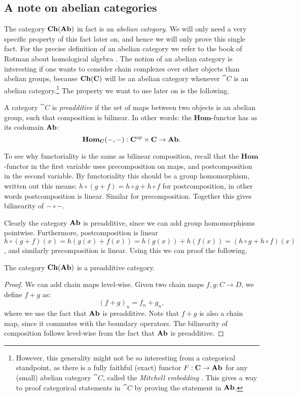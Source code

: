 \subsection{A note on abelian categories}
The category $\mathbf{Ch}(\mathbf{Ab})$ in fact is an \emph{abelian category}. We will only need a very specific property of this fact later on, and hence we will only prove this single fact. For the precise definition of an abelian category we refer to the book of Rotman about homological algebra \cite[Chapter~5.5]{rotman}. The notion of an abelian category is interesting if one wants to consider chain complexes over other objects than abelian groups, because $\mathbf{Ch}(\mathbf{C})$ will be an abelian category whenever $\cat{C}$ is an abelian category.\footnote{However, this generality might not be so interesting from a categorical standpoint, as there is a fully faithful (exact) functor $F: \mathbf{C} \to \mathbf{Ab}$ for any (small) abelian category $\cat{C}$, called the \emph{Mitchell embedding} \cite{rotman}. This gives a way to proof categorical statements in $\cat{C}$ by proving the statement in $\mathbf{Ab}$.} The property we want to use later on is the following.
\begin{definition}
	A category $\cat{C}$ is \emph{preadditive} if the set of maps between two objects is an abelian group, such that composition is bilinear. In other words: the $\mathbf{Hom}$-functor has as its codomain $\mathbf{Ab}$:
	$$ \mathbf{Hom}_{\mathbf{C}}(-, -) : \mathbf{C}^{op} \times \mathbf{C} \to \mathbf{Ab}. $$
\end{definition}
To see why functoriality is the same as bilinear composition, recall that the $\mathbf{Hom}$-functor in the first variable uses precomposition on maps, and postcomposition in the second variable. By functoriality this should be a group homomorphism, written out this means: $h \circ (g + f) = h \circ g + h \circ f$ for postcomposition, in other words postcomposition is linear. Similar for precomposition. Together this gives bilinearity of $- \circ -$.

Clearly the category $\mathbf{Ab}$ is preadditive, since we can add group homomorphisms pointwise. Furthermore, postcomposition is linear $h \circ (g + f) (x) = h(g(x)+f(x)) = h(g(x)) + h(f(x)) = (h \circ g + h \circ f) (x)$, and similarly precomposition is linear. Using this we can proof the following.
\begin{lemma}
	The category $\mathbf{Ch}(\mathbf{Ab})$ is a preadditive category.
\end{lemma}
\begin{proof}
	We can add chain maps level-wise. Given two chain maps $f, g: C \to D$, we define $f+g$ as:
	$$ (f+g)_n = f_n + g_n, $$
	where we use the fact that $\mathbf{Ab}$ is preadditive. Note that $f+g$ is also a chain map, since it commutes with the boundary operators. The bilinearity of composition follows level-wise from the fact that $\mathbf{Ab}$ is preadditive.
\end{proof}

